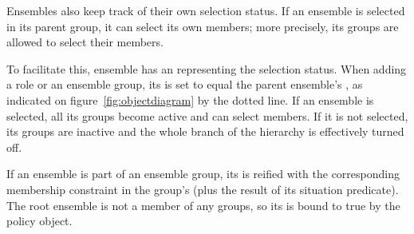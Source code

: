 Ensembles also keep track of their own selection status. If an ensemble is selected in
its parent group, it can select its own members; more precisely, its groups are allowed
to select their members.

To facilitate this, ensemble has an  representing the
selection status. When adding a role or an ensemble group, its  is set
to equal the parent ensemble's , as indicated on
figure~\ref{fig:objectdiagram} by the dotted line. If an ensemble is selected, all its
groups become active and can select members. If it is not selected, its groups are
inactive and the whole branch of the hierarchy is effectively turned off.

If an ensemble is part of an ensemble group, its  is reified with the
corresponding membership constraint in the group's  (plus the result
of its situation predicate). The root ensemble is not a member of any groups, so its
 is bound to true by the policy object.
